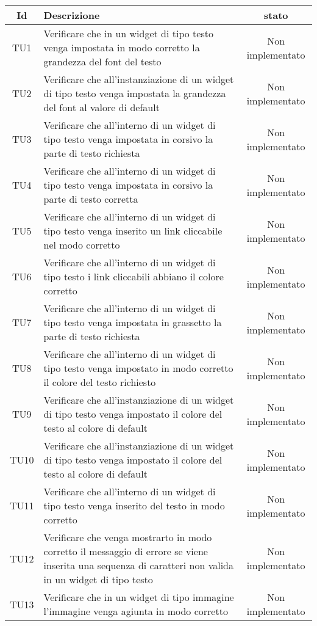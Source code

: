\begin{center}
	\begin{longtable}{|c|>{\centering}m{10cm}|c|}\hline
		Id & Descrizione & stato \\ \hline
		TU1 & Verificare che in un widget di tipo testo venga impostata in modo corretto la grandezza del font del testo & Non implementato \\ \hline
		TU2 & Verificare che all'instanziazione di un widget di tipo testo venga impostata la grandezza del font al valore di default & Non implementato \\ \hline
		TU3 & Verificare che all'interno di un widget di tipo testo venga impostata in corsivo la parte di testo richiesta & Non implementato \\ \hline
		TU4 & Verificare che all'interno di un widget di tipo testo venga impostata in corsivo la parte di testo corretta & Non implementato \\ \hline
		TU5 & Verificare che all'interno di un widget di tipo testo venga inserito un link cliccabile nel modo corretto & Non implementato \\ \hline
		TU6 & Verificare che all'interno di un widget di tipo testo i link cliccabili abbiano il colore corretto & Non implementato \\ \hline
		TU7 & Verificare che all'interno di un widget di tipo testo venga impostata in grassetto la parte di testo richiesta & Non implementato \\ \hline
		TU8 & Verificare che all'interno di un widget di tipo testo venga impostato in modo corretto il colore del testo richiesto & Non implementato \\ \hline
		TU9 & Verificare che all'instanziazione di un widget di tipo testo venga impostato il colore del testo al colore di default & Non implementato \\ \hline
		TU10 & Verificare che all'instanziazione di un widget di tipo testo venga impostato il colore del testo al colore di default & Non implementato \\ \hline
		TU11 & Verificare che all'interno di un widget di tipo testo venga inserito del testo in modo corretto & Non implementato \\ \hline
		TU12 & Verificare che venga mostrarto in modo corretto il messaggio di errore se viene inserita una sequenza di caratteri non valida in un widget di tipo testo & Non implementato \\ \hline
		TU13 & Verificare che in un widget di tipo immagine l'immagine venga agiunta in modo corretto & Non implementato \\ \hline

\end{longtable}
\end{center}
